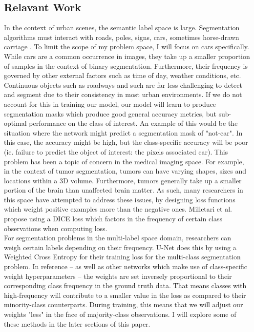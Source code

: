 \documentclass[Location Location Location! : Exploring Image Segmentation Problem In Urban Driving Scenarios]{IEEEtran}
\begin{document}
\subsection{Relavant Work} 

In the context of urban scenes, the semantic label space is large. Segmentation algorithms must interact with roads, poles, signs, cars, sometimes horse-drawn carriage \cite{b2}. To limit the scope of my problem space, I will focus on cars specifically. While cars are a common occurrence in images, they take up a smaller proportion of samples in the context of binary segmentation. Furthermore, their frequency is governed by other external factors such as time of day, weather conditions, etc. Continuous objects such as roadways and such are far less challenging to detect and segment due to their consistency in most urban environments. If we do not account for this in training our model, our model will learn to produce segmentation masks which produce good general accuracy metrics, but sub-optimal performance on the class of interest. An example of this would be the situation where the network might predict a segmentation mask of "not-car". In this case, the accuracy might be high, but the class-specific accuracy will be poor (ie. failure to predict the object of interest: the pixels associated car). This problem has been a topic of concern in the medical imaging space. For example, in the context of tumor segmentation, tumors can have varying shapes, sizes and locations within a 3D volume. Furthermore, tumors generally take up a smaller portion of the brain than unaffected brain matter. As such, many researchers in this space have attempted to address these issues, by designing loss functions which weight positive examples more than the negative ones. Milletari et al. \cite{b1} propose using a DICE loss which factors in the frequency of certain class observations when computing loss. \\

For segmentation problems in the multi-label space domain, researchers can weigh certain labels depending on their frequency. U-Net \cite{unet} does this by using a Weighted Cross Entropy for their training loss for the multi-class segmentation problem. In reference \cite{unet} -- as well as other networks which make use of class-specific weight hyperparameters  -- the weights are set inversely proportional to their corresponding class frequency in the ground truth data. That means classes with high-frequency will contribute to a smaller value in the loss as compared to their minority-class counterparts. During training, this means that we will adjust our weights "less" in the face of majority-class observations. I will explore some of these methods in the later sections of this paper.
\end{document}

